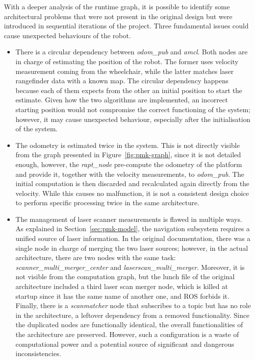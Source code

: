 With a deeper analysis of the runtime graph, it is possible to identify some architectural problems that were not present in the original design but were introduced in sequential iterations of the project. Three fundamental issues could cause unexpected behaviours of the robot.
\begin{itemize}
\item There is a circular dependency between \textit{odom\_pub} and \textit{amcl}. Both nodes are in charge of estimating the position of the robot. The former uses velocity measurement coming from the wheelchair, while the latter matches laser rangefinder data with a known map. The circular dependency happens because each of them expects from the other an initial position to start the estimate. Given how the two algorithms are implemented, an incorrect starting position would not compromise the correct functioning of the system; however, it may cause unexpected behaviour, especially after the initialisation of the system.
\item The odometry is estimated twice in the system. This is not directly visible from the graph presented in Figure~\ref{fig:pmk-graph}, since it is not detailed enough, however, the \textit{rapt\_node} pre-compute the odometry of the platform and provide it, together with the velocity measurements, to \textit{odom\_pub}. The initial computation is then discarded and recalculated again directly from the velocity. While this causes no malfunction, it is not a consistent design choice to perform specific processing twice in the same architecture. 
\item The management of laser scanner measurements is flawed in multiple ways. As explained in Section~\ref{sec:pmk-model}, the navigation subsystem requires a unified source of laser information. In the original documentation, there was a single node in charge of merging the two laser sources; however, in the actual architecture, there are two nodes with the same task: \textit{scanner\_multi\_merger\_center} and \textit{laserscan\_multi\_merger}. Moreover, it is not visible from the computation graph, but the lunch file of the original architecture included a third laser scan merger node,  which is killed at startup since it has the same name of another one, and ROS forbids it. Finally, there is a \textit{scanmatcher} node that subscribes to a topic but has no role in the architecture, a leftover dependency from a removed functionality. Since the duplicated nodes are functionally identical, the overall functionalities of the architecture are preserved. However, such a configuration is a waste of computational power and a potential source of significant and dangerous inconsistencies.
\end{itemize}


